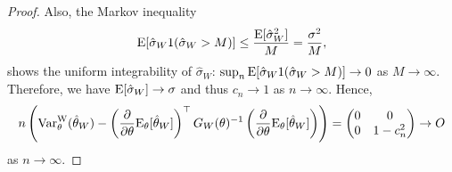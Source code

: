 \documentclass[11pt, a4paper]{article}
\begin{document}
\begin{proof}
	Also, the Markov inequality
	\begin{align*}
		{\rm E}[\hat{\sigma}_W 1 (\hat{\sigma}_W>M)] \leq \frac{{\rm E}[\hat{\sigma}_W^2]}{M}=\frac{\sigma^2}{M},
	\end{align*}
	shows the uniform integrability of $\hat{\sigma}_W$: $\sup_n {\rm E}[\hat{\sigma}_W 1 (\hat{\sigma}_W>M)] \to 0$ as $M \to \infty$.
	Therefore, we have ${\rm E}[\hat{\sigma}_W] \to \sigma$ and thus $c_n \to 1$ as $n \to \infty$.
	Hence,
	\begin{align*}
		n \left( {\rm Var}_{\theta}^{\mathrm{W}}(\hat{\theta}_W) -\left(\frac{\partial}{\partial \theta} {\rm E}_{\theta} [\hat{\theta}_W] \right)^\top G_W(\theta)^{-1} \left(\frac{\partial}{\partial \theta} {\rm E}_{\theta} [\hat{\theta}_W]\right) \right) = \begin{pmatrix}
			0 & 0 \\
			0 & 1-c_n^2
		\end{pmatrix} \to O
	\end{align*}
	as $n\to\infty$.
\end{proof}
\end{document}
